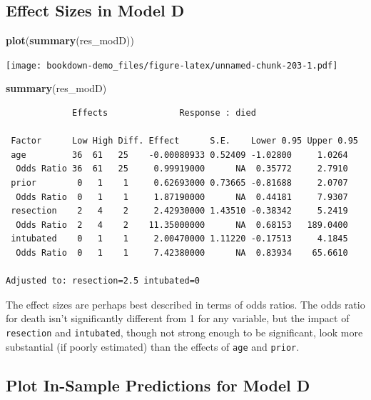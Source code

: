\documentclass[]{book}
\newenvironment{Shaded}{\begin{snugshade}}{\end{snugshade}}
\newcommand{\KeywordTok}[1]{\textcolor[rgb]{0.13,0.29,0.53}{\textbf{#1}}}
\newcommand{\NormalTok}[1]{#1}
\theoremstyle{definition}
\theoremstyle{definition}
\theoremstyle{definition}
\theoremstyle{remark}
\begin{document}
\subsection{Effect Sizes in Model D}\label{effect-sizes-in-model-d}

\begin{Shaded}
\begin{Highlighting}[]
\KeywordTok{plot}\NormalTok{(}\KeywordTok{summary}\NormalTok{(res_modD))}
\end{Highlighting}
\end{Shaded}

\texttt{[image: bookdown-demo\_files/figure-latex/unnamed-chunk-203-1.pdf]}

\begin{Shaded}
\begin{Highlighting}[]
\KeywordTok{summary}\NormalTok{(res_modD)}
\end{Highlighting}
\end{Shaded}

\begin{verbatim}
             Effects              Response : died 

 Factor      Low High Diff. Effect      S.E.    Lower 0.95 Upper 0.95
 age         36  61   25    -0.00080933 0.52409 -1.02800     1.0264  
  Odds Ratio 36  61   25     0.99919000      NA  0.35772     2.7910  
 prior        0   1    1     0.62693000 0.73665 -0.81688     2.0707  
  Odds Ratio  0   1    1     1.87190000      NA  0.44181     7.9307  
 resection    2   4    2     2.42930000 1.43510 -0.38342     5.2419  
  Odds Ratio  2   4    2    11.35000000      NA  0.68153   189.0400  
 intubated    0   1    1     2.00470000 1.11220 -0.17513     4.1845  
  Odds Ratio  0   1    1     7.42380000      NA  0.83934    65.6610  

Adjusted to: resection=2.5 intubated=0  
\end{verbatim}

The effect sizes are perhaps best described in terms of odds ratios. The
odds ratio for death isn't significantly different from 1 for any
variable, but the impact of \texttt{resection} and \texttt{intubated},
though not strong enough to be significant, look more substantial (if
poorly estimated) than the effects of \texttt{age} and \texttt{prior}.

\subsection{Plot In-Sample Predictions for Model
D}\label{plot-in-sample-predictions-for-model-d}
\end{document}
